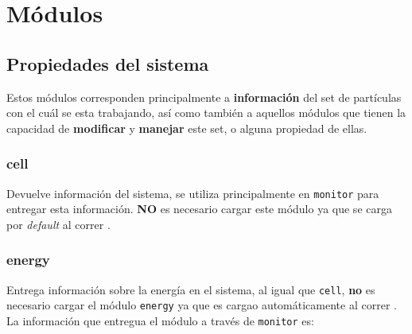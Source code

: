 \chapter{M\'odulos}
\label{chap:modulos}

\section{Propiedades del sistema}
Estos m\'odulos corresponden principalmente a \textbf{informaci\'on} del set de part\'iculas con el cu\'al se esta trabajando, as\'i como tambi\'en a aquellos m\'odulos que tienen la capacidad de \textbf{modificar} y \textbf{manejar} este set, o alguna propiedad de ellas.
\subsection{cell}
Devuelve informaci\'on del sistema, se utiliza principalmente en \verb|monitor| para entregar esta informaci\'on. \textbf{NO} es necesario cargar este m\'odulo ya que se carga por \textit{default} al correr \lpmd.


\subsection{energy}
Entrega informaci\'on sobre la energ\'ia en el sistema, al igual que \verb|cell|, \textbf{no} es necesario cargar el m\'odulo \verb|energy| ya que es cargao autom\'aticamente al correr \lpmd. La informaci\'on que entregua el m\'odulo a trav\'es de \verb|monitor| es:


